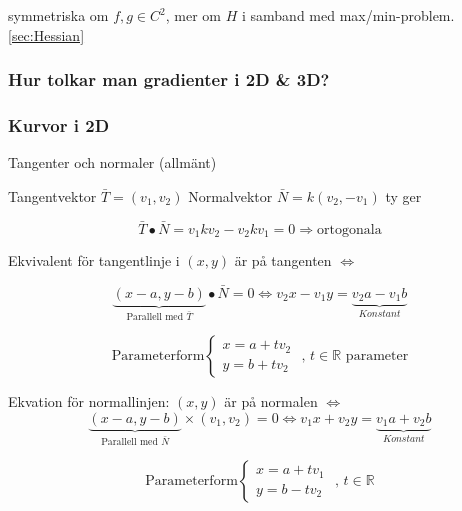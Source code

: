 \documentclass[a4paper]{article}
\begin{document}
symmetriska om \(f,g \in C^2\), \newline mer om \(H\) i samband med max/min-problem. \vref{sec:Hessian}

\subsubsection{Hur tolkar man gradienter i 2D \& 3D?}

\subsubsection*{Kurvor i 2D}

Tangenter och normaler (allmänt)

Tangentvektor \(\bar{T} = (v_1,v_2)\) \newline
Normalvektor \(\bar{N} = k(v_2,-v_1)\) ty ger \newline

\[\bar{T} \bullet \bar{N} = v_1kv_2 - v_2kv_1 = 0 \Rightarrow \text{ortogonala}\]

Ekvivalent för tangentlinje i \((x,y)\) är på tangenten \(\iff\) \newline

\[\underbrace{(x-a,y-b)}_{\text{Parallell med }\bar{T}} \bullet \bar{N} = 0 \iff v_2x - v_1y = \underbrace{v_2a - v_1b}_{Konstant}\]

\[
	\text{Parameterform}
	\left\{\begin{array}{rcl}
		x=a+tv_2 \\
		y=b+tv_2
	\end{array}\right.
	\text{ , } t \in \mathbb{R} \text{ parameter}
\]

Ekvation för normallinjen: \((x,y)\) är på normalen \(\iff\)
\[
	\underbrace{(x-a,y-b)}_{\text{Parallell med }\bar{N}} \times (v_1,v_2) = 0 \iff v_1x + v_2y = \underbrace{v_1a + v_2b}_{Konstant}
\]

\[
	\text{Parameterform}
	\left\{\begin{array}{rcl}
		x=a+tv_1 \\
		y=b-tv_2
	\end{array}\right.
	\text{ , } t \in \mathbb{R}
\]
\end{document}
